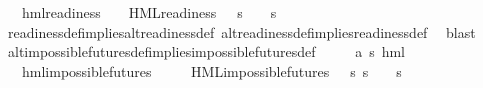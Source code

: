 \begin{isabellebody}
\ \ {\isachardoublequoteopen}{\isasymforall}{\isasymphi}{\isachardot}{\kern0pt}\ {\isacharparenleft}{\kern0pt}hml{\isacharunderscore}{\kern0pt}readiness\ {\isasymphi}\ {\isasymlongrightarrow}\ {\isacharparenleft}{\kern0pt}{\isasymexists}{\isasympsi}{\isachardot}{\kern0pt}\ HML{\isacharunderscore}{\kern0pt}readiness\ {\isasympsi}\ {\isasymand}\ {\isacharparenleft}{\kern0pt}s\ {\isasymTurnstile}\ {\isasympsi}\ {\isasymlongleftrightarrow}\ s\ {\isasymTurnstile}\ {\isasymphi}{\isacharparenright}{\kern0pt}{\isacharparenright}{\kern0pt}{\isacharparenright}{\kern0pt}{\isachardoublequoteclose}\isanewline
%
\isadelimproof
\ \ %
\endisadelimproof
%
\isatagproof
{}\isamarkupfalse%
\ readiness{\isacharunderscore}{\kern0pt}def{\isacharunderscore}{\kern0pt}implies{\isacharunderscore}{\kern0pt}alt{\isacharunderscore}{\kern0pt}readiness{\isacharunderscore}{\kern0pt}def\ alt{\isacharunderscore}{\kern0pt}readiness{\isacharunderscore}{\kern0pt}def{\isacharunderscore}{\kern0pt}implies{\isacharunderscore}{\kern0pt}readiness{\isacharunderscore}{\kern0pt}def\ \isamarkupfalse%
\ blast{\isacharplus}{\kern0pt}%
\endisatagproof
{\isafoldproof}%
%
\isadelimproof
\isanewline
%
\endisadelimproof
\isanewline
{}\isamarkupfalse%
\ alt{\isacharunderscore}{\kern0pt}impossible{\isacharunderscore}{\kern0pt}futures{\isacharunderscore}{\kern0pt}def{\isacharunderscore}{\kern0pt}implies{\isacharunderscore}{\kern0pt}impossible{\isacharunderscore}{\kern0pt}futures{\isacharunderscore}{\kern0pt}def{\isacharcolon}{\kern0pt}\isanewline
\ \ \ {\isasymphi}\ {\isacharcolon}{\kern0pt}{\isacharcolon}{\kern0pt}\ {\isachardoublequoteopen}{\isacharparenleft}{\kern0pt}{\isacharprime}{\kern0pt}a{\isacharcomma}{\kern0pt}\ {\isacharprime}{\kern0pt}s{\isacharparenright}{\kern0pt}\ hml{\isachardoublequoteclose}\isanewline
\ \ \ {\isachardoublequoteopen}hml{\isacharunderscore}{\kern0pt}impossible{\isacharunderscore}{\kern0pt}futures\ {\isasymphi}{\isachardoublequoteclose}\isanewline
\ \ \ {\isachardoublequoteopen}{\isasymexists}{\isasympsi}{\isachardot}{\kern0pt}\ HML{\isacharunderscore}{\kern0pt}impossible{\isacharunderscore}{\kern0pt}futures\ {\isasympsi}\ {\isasymand}\ {\isacharparenleft}{\kern0pt}{\isasymforall}s{\isachardot}{\kern0pt}\ {\isacharparenleft}{\kern0pt}s\ {\isasymTurnstile}\ {\isasymphi}{\isacharparenright}{\kern0pt}\ {\isasymlongleftrightarrow}\ {\isacharparenleft}{\kern0pt}s\ {\isasymTurnstile}\ {\isasympsi}{\isacharparenright}{\kern0pt}{\isacharparenright}{\kern0pt}{\isachardoublequoteclose}\isanewline

\end{isabellebody}

